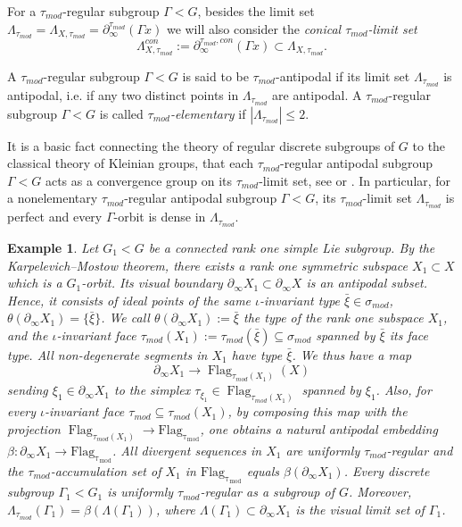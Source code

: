 \documentclass[12pt]{article}
\theoremstyle{boldplain}
\theoremstyle{bolddefinition}
\newtheorem{example}[equation]{Example}
\numberwithin{equation}{section}
\def\Ga{\Gamma}
\def\La{\Lambda}
\def\si{\sigma}
\def\Flag{\operatorname{Flag}}
\def\Flagt{\operatorname{Flag_{\tau_{mod}}}}
\def\geo{\partial_{\infty}}
\def\geot{\partial_{\infty}^{\tau_{mod}}}
\def\geotc{\partial_{\infty}^{\tau_{mod},con}}
\def\Lat{\La_{\tau_{mod}}}
\def\LaXt{\Lambda_{X,\tau_{mod}}}
\def\LaXtc{\Lambda_{X,\tau_{mod}}^{con}}
\def\simod{\si_{mod}}
\def\taumod{\tau_{mod}}
\begin{document}
For a $\taumod$-regular subgroup $\Ga< G$, 
besides the limit set $\Lat=\LaXt=\geot(\Ga x)$ we will also consider the {\em conical $\taumod$-limit set} 
$$
\LaXtc:=\geotc(\Ga x)\subset \LaXt.$$

A $\taumod$-regular  subgroup $\Ga< G$ is said to be $\taumod$-antipodal if its limit set $\Lat$ is antipodal, 
i.e. if any two distinct points in $\Lat$ are antipodal.
A $\taumod$-regular subgroup $\Ga< G$ is called {\em $\taumod$-elementary} if $|\Lat|\le 2$.

It is a basic fact connecting the theory of regular discrete subgroups of $G$ to the classical theory of Kleinian groups, that  
each $\taumod$-regular antipodal subgroup $\Ga< G$ acts as a convergence group on its $\taumod$-limit set,  
see  \cite[\S 5.1]{anolec} or \cite[Corollary 3.16]{manicures}. 
In particular, for a nonelementary $\taumod$-regular antipodal subgroup $\Ga< G$, 
its $\taumod$-limit set $\Lat$  is perfect and every $\Ga$-orbit is dense in $\Lat$. 
 

\begin{example}\label{ex:rank1embedding}
Let $G_1<G$ be a connected rank one simple Lie subgroup.
By the Karpelevich--Mostow theorem,
there exists a rank one symmetric subspace $X_1\subset X$
which is a $G_1$-orbit. 
Its visual boundary $\geo X_1\subset \geo X$ is an antipodal subset. 
Hence, it consists of ideal points of the same $\iota$-invariant type $\bar\xi\in\simod$,
$\theta(\geo X_1)=\{\bar\xi\}$.
We call $\theta(\geo X_1):=\bar\xi$ the {\em type} of the rank one subspace $X_1$,
and the $\iota$-invariant face $\taumod(X_1):=\taumod(\bar\xi)\subseteq\simod$ spanned by $\bar\xi$ its {\em face type}. 
All non-degenerate segments in $X_1$ have type $\bar\xi$.
We thus have a map 
$$
\geo X_1\to \Flag_{\taumod(X_1)}(X) 
$$
sending $\xi_1\in \geo X_1$ to the simplex $\tau_{\xi_1}\in \Flag_{\taumod(X_1)}$ spanned by 
$\xi_1$. 
Also, for every $\iota$-invariant face $\taumod\subseteq\taumod(X_1)$, by composing this map with the projection
$\Flag_{\taumod(X_1)}\to \Flagt$, one obtains a natural antipodal embedding $\beta: \geo X_1\to \Flagt$. 
All divergent sequences in $X_1$ 
are uniformly $\taumod$-regular and the $\taumod$-accumulation set
of $X_1$ in $\Flagt$ equals $\beta(\geo X_1)$. 
Every discrete subgroup $\Ga_1< G_1$ is uniformly $\taumod$-regular as a subgroup of $G$.
Moreover, $\Lat(\Ga_1)=\beta(\La(\Ga_1))$, where $\La(\Ga_1)\subset \geo X_1$ 
is the visual limit set of $\Ga_1$. 
\end{example}
\end{document}
